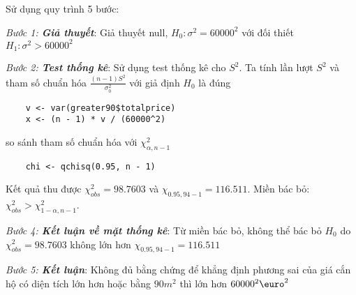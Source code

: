 Sử dụng quy trình 5 bước:

\textit{Bước 1: \textbf{Giả thuyết}}: 
Giả thuyết null, $H_0: \sigma^2 = 60000^2$ với đối thiết $H_1: \sigma^2 > 60000^2$

\textit{Bước 2: \textbf{Test thống kê}}:
Sử dụng test thống kê cho $S^2$. Ta tính lần lượt $S^2$ và tham số chuẩn hóa $\frac{(n - 1) S^2}{\sigma_0^2}$
với giả định $H_0$ là đúng 
\begin{lstlisting}
    v <- var(greater90$totalprice)
    x <- (n - 1) * v / (60000^2)
\end{lstlisting}

so sánh tham số chuẩn hóa với  $\chi_{\alpha, n - 1}^2$
\begin{lstlisting}
    chi <- qchisq(0.95, n - 1)
\end{lstlisting}
Kết quả thu được $\chi_{obs}^2 = 98.7603$ và $\chi_{0.95, 94 - 1} = 116.511$. 
Miền bác bỏ: $\chi_{obs}^2 > \chi_{1 - \alpha, n - 1}^2$.

\textit{Bước 4: \textbf{Kết luận về mặt thống kê}}:
Từ miền bác bỏ, không thể bác bỏ $H_0$ do $\chi_{obs}^2 = 98.7603$ không lớn hơn $\chi_{0.95, 94 - 1} = 116.511$

\textit{Bước 5: \textbf{Kết luận}}: Không đủ bằng chứng để  khẳng định phương sai của giá cắn hộ có diện tích 
lớn hơn hoặc bằng $90m^2$ thì lớn hơn $60000^2\text{\euro}^2$